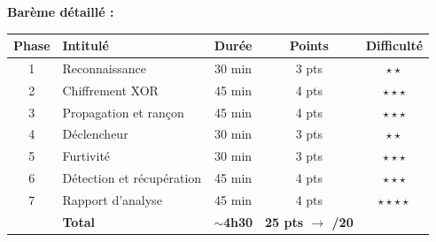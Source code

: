 \documentclass[a4paper,11pt]{article}
\theoremstyle{plain}
\theoremstyle{definition}
\begin{document}
\bigskip
\noindent\textbf{Barème détaillé :}
\begin{center}
\begin{tabular}{clccc}
\toprule
\textbf{Phase} & \textbf{Intitulé} & \textbf{Durée} & \textbf{Points} & \textbf{Difficulté} \\
\midrule
1 & Reconnaissance & 30 min & 3 pts & $\star\star$ \\
2 & Chiffrement XOR & 45 min & 4 pts & $\star\star\star$ \\
3 & Propagation et rançon & 45 min & 4 pts & $\star\star\star$ \\
4 & Déclencheur & 30 min & 3 pts & $\star\star$ \\
5 & Furtivité & 30 min & 3 pts & $\star\star\star$ \\
6 & Détection et récupération & 45 min & 4 pts & $\star\star\star$ \\
7 & Rapport d'analyse & 45 min & 4 pts & $\star\star\star\star$ \\
\midrule
& \textbf{Total} & \textbf{$\sim$4h30} & \textbf{25 pts $\to$ /20} & \\
\bottomrule
\end{tabular}
\end{center}

\bigskip

\end{document}
